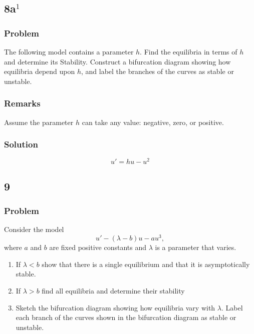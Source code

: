 \documentclass[12pt]{article}
\begin{document}
\subsection{8a$^1$}
\subsubsection*{Problem}
The following model contains a parameter $h$. Find the equilibria in terms of
$h$ and determine its Stability. Construct a bifurcation diagram showing how
equilibria depend upon $h$, and label the branches of the curves as stable or
unstable.

\subsubsection*{Remarks}
Assume the parameter $h$ can take any value: negative, zero, or positive.

\subsubsection*{Solution}
\todo[]

\begin{equation}
  \label{eq:8a-problem}
  u'=hu-u^2
\end{equation}

\subsection{9}
\subsubsection*{Problem}
Consider the model
\begin{equation}
  \label{eq:9-problem}
  u'-(\lambda - b) u-au^3,
\end{equation}
where $a$ and $b$ are fixed positive constants and $\lambda$ is a parameter that
varies.

\begin{enumerate}
\item If $\lambda < b$  show that there is a single equilibrium and that it is
  asymptotically stable.
\item If $\lambda > b$ find all equilibria and determine their stability
\item Sketch the bifurcation diagram showing how equilibria vary with $\lambda$.
  Label each branch of the curves shown in the bifurcation diagram as stable or
  unstable.
\end{enumerate}
\end{document}
